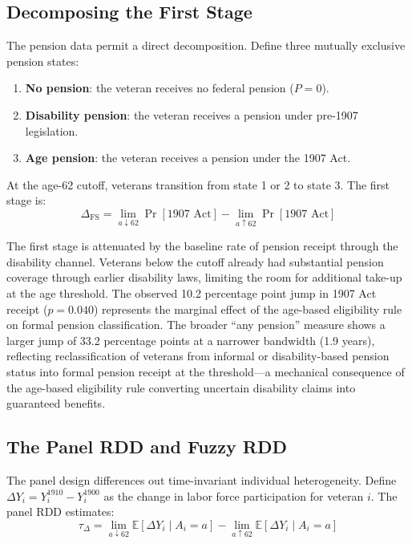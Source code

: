 \documentclass[12pt]{article}
\newcommand{\E}{\mathbb{E}}
\begin{document}
\subsection{Decomposing the First Stage}

The pension data permit a direct decomposition. Define three mutually exclusive pension states:

\begin{enumerate}
\item \textbf{No pension}: the veteran receives no federal pension ($P = 0$).
\item \textbf{Disability pension}: the veteran receives a pension under pre-1907 legislation.
\item \textbf{Age pension}: the veteran receives a pension under the 1907 Act.
\end{enumerate}

At the age-62 cutoff, veterans transition from state 1 or 2 to state 3. The first stage is:
\begin{equation}
\Delta_{\text{FS}} = \lim_{a \downarrow 62} \Pr[\text{1907 Act}] - \lim_{a \uparrow 62} \Pr[\text{1907 Act}]
\end{equation}

The first stage is attenuated by the baseline rate of pension receipt through the disability channel. Veterans below the cutoff already had substantial pension coverage through earlier disability laws, limiting the room for additional take-up at the age threshold. The observed 10.2 percentage point jump in 1907 Act receipt ($p = 0.040$) represents the marginal effect of the age-based eligibility rule on formal pension classification. The broader ``any pension'' measure shows a larger jump of 33.2 percentage points at a narrower bandwidth (1.9 years), reflecting reclassification of veterans from informal or disability-based pension status into formal pension receipt at the threshold---a mechanical consequence of the age-based eligibility rule converting uncertain disability claims into guaranteed benefits.

\subsection{The Panel RDD and Fuzzy RDD}

The panel design differences out time-invariant individual heterogeneity. Define $\Delta Y_i = Y_i^{1910} - Y_i^{1900}$ as the change in labor force participation for veteran $i$. The panel RDD estimates:
\begin{equation}
\tau_{\Delta} = \lim_{a \downarrow 62} \E[\Delta Y_i \mid A_i = a] - \lim_{a \uparrow 62} \E[\Delta Y_i \mid A_i = a]
\end{equation}
\end{document}
